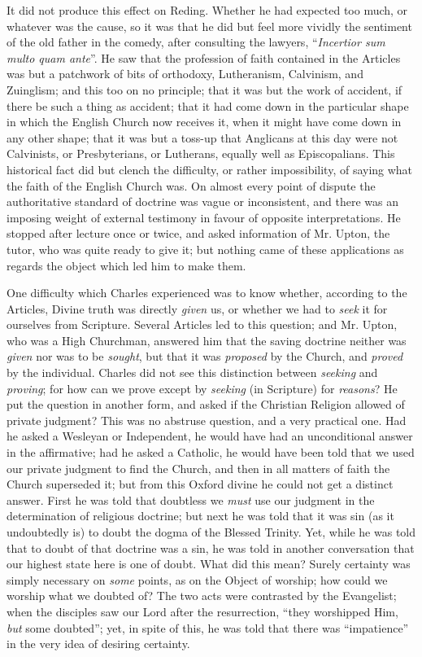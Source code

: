 It did not produce this effect on Reding. Whether he had expected
too much, or whatever was the cause, so it was that he did but feel
more vividly the sentiment of the old father in the comedy, after
consulting the lawyers, ``\emph{Incertior sum multo quam ante}''.
He saw that the profession of faith contained in the Articles was but
a patchwork of bits of orthodoxy, Lutheranism, Calvinism, and
Zuinglism; and this too on no principle; that it was but the work of
accident, if there be such a thing as accident; that it had come down
in the particular shape in which the English Church now receives it,
when it might have come down in any other shape; that it was but a
toss-up that Anglicans at this day were not Calvinists, or
Presbyterians, or Lutherans, equally well as Episcopalians. This
historical fact did but clench the difficulty, or rather
impossibility, of saying what the faith of the English Church was. On
almost every point of dispute the authoritative standard of doctrine
was vague or inconsistent, and there was an imposing weight of
external testimony in favour of opposite interpretations. He stopped
after lecture once or twice, and asked information of Mr. Upton, the
tutor, who was quite ready to give it; but nothing came of these
applications as regards the object which led him to make them.

One difficulty which Charles experienced was to know whether,
according to the Articles, Divine truth was directly \emph{given} us,
or whether we had to \emph{seek} it for ourselves from Scripture.
Several Articles led to this question; and Mr. Upton, who was a High
Churchman, answered him that the saving doctrine neither was \emph{given}
nor was to be \emph{sought}, but that it was \emph{proposed} by
the Church, and \emph{proved} by the individual. Charles did not see
this distinction between \emph{seeking} and \emph{proving}; for how
can we prove except by \emph{seeking} (in Scripture) for \emph{reasons}?
He put the question in another form, and asked if the Christian
Religion allowed of private judgment? This was no abstruse question,
and a very practical one. Had he asked a Wesleyan or Independent, he
would have had an unconditional answer in the affirmative; had he
asked a Catholic, he would have been told that we used our private
judgment to find the Church, and then in all matters of faith the
Church superseded it; but from this Oxford divine he could not get a
distinct answer. First he was told that doubtless we \emph{must} use
our judgment in the determination of religious doctrine; but next he
was told that it was sin (as it undoubtedly is) to doubt the dogma of
the Blessed Trinity. Yet, while he was told that to doubt of that
doctrine was a sin, he was told in another conversation that our
highest state here is one of doubt. What did this mean? Surely
certainty was simply necessary on \emph{some} points, as on the Object
of worship; how could we worship what we doubted of? The two acts were
contrasted by the Evangelist; when the disciples saw our Lord after
the resurrection, ``they worshipped Him, \emph{but} some
doubted''; yet, in spite of this, he was told that there was
``impatience'' in the very idea of desiring certainty.

